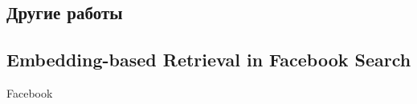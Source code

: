 \begin{bibunit}[plainnat]











\chapter{Другие работы}

\section{Embedding-based Retrieval in Facebook Search}

Facebook \\


\end{bibunit}
